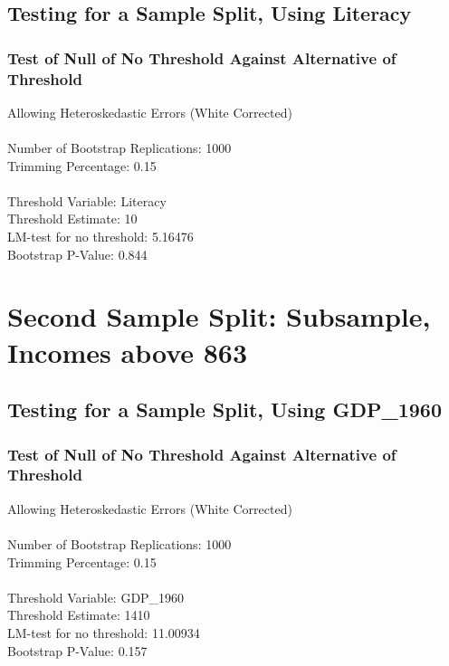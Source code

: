 \subsection{Testing for a Sample Split, Using Literacy} 
\subsubsection*{Test of Null of No Threshold Against Alternative of Threshold} 
Allowing Heteroskedastic Errors (White Corrected) \\\\
Number of Bootstrap Replications:  1000 \\
Trimming Percentage:               0.15 \\\\
Threshold Variable:                 Literacy \\
Threshold Estimate:                10 \\
LM-test for no threshold:          5.16476 \\
Bootstrap P-Value:                 0.844 \\

\section{Second Sample Split: Subsample, Incomes above 863}

\subsection{Testing for a Sample Split, Using GDP\_1960} 
\subsubsection*{Test of Null of No Threshold Against Alternative of Threshold} 
Allowing Heteroskedastic Errors (White Corrected) \\\\
Number of Bootstrap Replications:  1000 \\
Trimming Percentage:               0.15 \\\\
Threshold Variable:                 GDP\_1960 \\
Threshold Estimate:                1410 \\
LM-test for no threshold:          11.00934 \\
Bootstrap P-Value:                 0.157 \\

